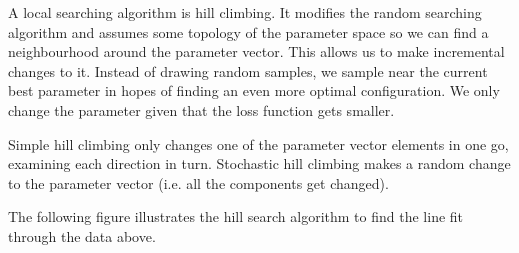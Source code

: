 \documentclass[a4paper, openany]{memoir}
\begin{document}
A local searching algorithm is hill climbing. It modifies the random searching algorithm and assumes some topology of the parameter space so we can find a neighbourhood around the parameter vector. This allows us to make incremental changes to it. Instead of drawing random samples, we sample near the current best parameter in hopes of finding an even more optimal configuration. We only change the parameter given that the loss function gets smaller.

Simple hill climbing only changes one of the parameter vector elements in one go, examining each direction in turn. Stochastic hill climbing makes a random change to the parameter vector (i.e. all the components get changed). 

The following figure illustrates the hill search algorithm to find the line fit through the data above.
\end{document}
